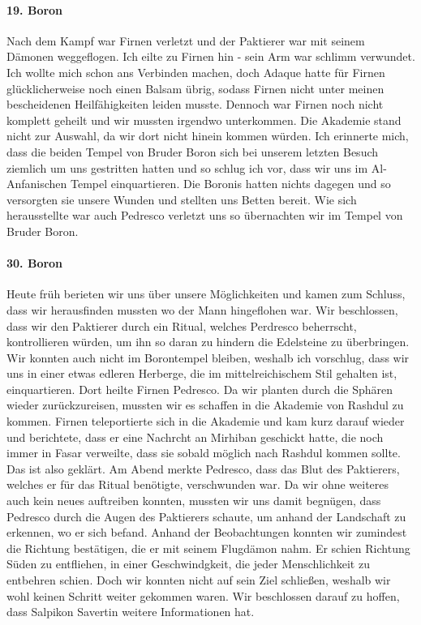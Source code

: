 \paragraph{19. Boron}
Nach dem Kampf war Firnen verletzt und der Paktierer war mit seinem Dämonen weggeflogen. Ich eilte zu Firnen hin - sein Arm war schlimm verwundet. Ich wollte mich schon ans Verbinden machen, doch Adaque hatte für Firnen glücklicherweise noch einen Balsam übrig, sodass Firnen nicht unter meinen bescheidenen Heilfähigkeiten leiden musste. Dennoch war Firnen noch nicht komplett geheilt und wir mussten irgendwo unterkommen. Die Akademie stand nicht zur Auswahl, da wir dort nicht hinein kommen würden. Ich erinnerte mich, dass die beiden Tempel von Bruder Boron sich bei unserem letzten Besuch ziemlich um uns gestritten hatten und so schlug ich vor, dass wir uns im Al-Anfanischen Tempel einquartieren. Die Boronis hatten nichts dagegen und so versorgten sie unsere Wunden und stellten uns Betten bereit. Wie sich herausstellte war auch Pedresco verletzt uns so übernachten wir im Tempel von Bruder Boron.

\paragraph{30. Boron}
Heute früh berieten wir uns über unsere Möglichkeiten und kamen zum Schluss, dass wir herausfinden mussten wo der Mann hingeflohen war. Wir beschlossen, dass wir den Paktierer durch ein Ritual, welches Perdresco beherrscht, kontrollieren würden, um ihn so daran zu hindern die Edelsteine zu überbringen. Wir konnten auch nicht im Borontempel bleiben, weshalb ich vorschlug, dass wir uns in einer etwas edleren Herberge, die im mittelreichischem Stil gehalten ist, einquartieren. Dort heilte Firnen Pedresco. Da wir planten durch die Sphären wieder zurückzureisen, mussten wir es schaffen in die Akademie von Rashdul zu kommen. Firnen teleportierte sich in die Akademie und kam kurz darauf wieder und berichtete, dass er eine Nachrcht an Mirhiban geschickt hatte, die noch immer in Fasar verweilte, dass sie sobald möglich nach Rashdul kommen sollte. Das ist also geklärt. Am Abend merkte Pedresco, dass das Blut des Paktierers, welches er für das Ritual benötigte, verschwunden war. Da wir ohne weiteres auch kein neues auftreiben konnten, mussten wir uns damit begnügen, dass Pedresco durch die Augen des Paktierers schaute, um anhand der Landschaft zu erkennen, wo er sich befand. Anhand der Beobachtungen konnten wir zumindest die Richtung bestätigen, die er mit seinem Flugdämon nahm. Er schien Richtung Süden zu entfliehen, in einer Geschwindgkeit, die jeder Menschlichkeit zu entbehren schien. Doch wir konnten nicht auf sein Ziel schließen, weshalb wir wohl keinen Schritt weiter gekommen waren. Wir beschlossen darauf zu hoffen, dass Salpikon Savertin weitere Informationen hat.

